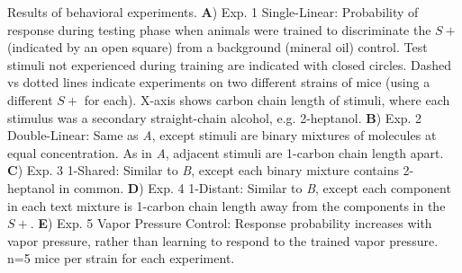 \label{fig:results}
Results of behavioral experiments. \textbf{A}) Exp. 1 Single-Linear: Probability of response during testing phase when animals were trained to discriminate the $S+$ (indicated by an open square) from a background (mineral oil) control.  Test stimuli not experienced during training are indicated with closed circles.  Dashed vs dotted lines indicate experiments on two different strains of mice (using a different $S+$ for each).  X-axis shows carbon chain length of stimuli, where each stimulus was a secondary straight-chain alcohol, e.g. 2-heptanol.  \textbf{B})  Exp. 2 Double-Linear: Same as \textit{A}, except stimuli are binary mixtures of molecules at equal concentration.  As in \textit{A}, adjacent stimuli are 1-carbon chain length apart. \textbf{C}) Exp. 3 1-Shared: Similar to \textit{B}, except each binary mixture contains 2-heptanol in common. \textbf{D})  Exp. 4 1-Distant: Similar to \textit{B}, except each component in each text mixture is 1-carbon chain length away from the components in the $S+$. \textbf{E}) Exp. 5 Vapor Pressure Control: Response probability increases with vapor pressure, rather than learning to respond to the trained vapor pressure.  n=5 mice per strain for each experiment.  